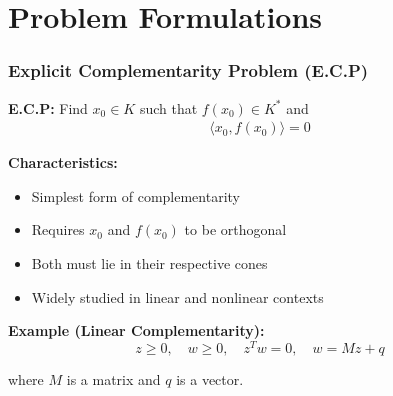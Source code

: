 \documentclass[aspectratio=169,10pt]{beamer}
\begin{document}
\section{Problem Formulations}

\begin{frame}
\frametitle{Explicit Complementarity Problem (E.C.P)}

\begin{definition}
\textbf{E.C.P:} Find $x_0 \in K$ such that $f(x_0) \in K^*$ and
\begin{align*}
\langle x_0, f(x_0) \rangle = 0
\end{align*}
\end{definition}

\vspace{0.3cm}

\textbf{Characteristics:}
\begin{itemize}
    \item Simplest form of complementarity
    \item Requires $x_0$ and $f(x_0)$ to be orthogonal
    \item Both must lie in their respective cones
    \item Widely studied in linear and nonlinear contexts
\end{itemize}

\vspace{0.3cm}

\textbf{Example (Linear Complementarity):}
$$z \geq 0, \quad w \geq 0, \quad z^T w = 0, \quad w = Mz + q$$

where $M$ is a matrix and $q$ is a vector.

\end{frame}
\end{document}
